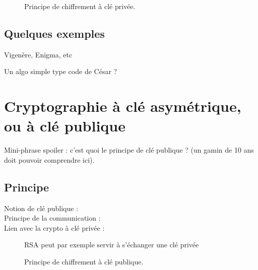\documentclass[a4paper,11pt]{article}
\begin{document}
\begin{figure}[!h]
\begin{center}
  \caption{Principe de chiffrement à clé privée.}
  \label{etiquette_de_la_figure_pour_y_faire_reference_plus_tard}
\end{center}
\end{figure}


\subsection{Quelques exemples}

Vigenère, Enigma, etc

\begin{center}
\begin{algorithm}
\caption{Un algo simple type code de César ?}
\label{etiquette_de_l_algo_pour_y_faire_reference_plus_tard}
\end{algorithm}
\end{center}


\section{Cryptographie à clé asymétrique, ou à clé publique}

Mini-phrase spoiler : c'est quoi le principe de clé publique ? (un gamin de 10 ans doit pouvoir comprendre ici).

\subsection{Principe}

\begin{description}
\item [Notion de clé publique : ]

\item [Principe de la communication : ]

\item [Lien avec la crypto à clé privée :] RSA peut par exemple servir à s'échanger une clé privée

\end{description}

\begin{figure}[!h]
\begin{center}
  \caption{Principe de chiffrement à clé publique.}
  \label{etiquette_de_la_figure_pour_y_faire_reference_plus_tard}
\end{center}
\end{figure}
\end{document}
